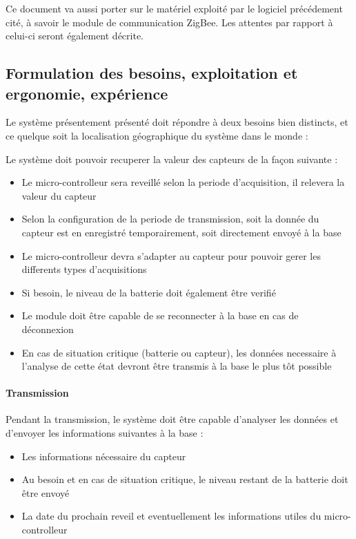 Ce document va aussi porter sur le matériel exploité par le logiciel précédement cité, à savoir le module de communication ZigBee. Les attentes par rapport à celui-ci seront également décrite.

\subsection{Formulation des besoins, exploitation et ergonomie, expérience}

Le système présentement présenté doit répondre à deux besoins bien distincts, et ce quelque soit la localisation géographique du système dans le monde :

 Le système doit pouvoir recuperer la valeur des capteurs de la façon suivante :

\begin{itemize}
\item Le micro-controlleur sera reveillé selon la periode d'acquisition, il relevera la valeur du capteur 
\item Selon la configuration de la periode de transmission, soit la donnée du capteur est en enregistré temporairement, soit directement envoyé à la base
\item Le micro-controlleur devra s'adapter au capteur pour pouvoir gerer les differents types d'acquisitions
\item Si besoin, le niveau de la batterie doit également être verifié
\item Le module doit être capable de se reconnecter à la base en cas de déconnexion
\item En cas de situation critique (batterie ou capteur), les données necessaire à l'analyse de cette état devront être transmis à la base le plus tôt possible
\end{itemize}

\paragraph{Transmission} Pendant la transmission, le système doit être capable d'analyser les données et d'envoyer les informations suivantes à la base :

\begin{itemize}
\item Les informations nécessaire du capteur
\item Au besoin et en cas de situation critique, le niveau restant de la batterie doit être envoyé
\item La date du prochain reveil et eventuellement les informations utiles du micro-controlleur
\end{itemize}

